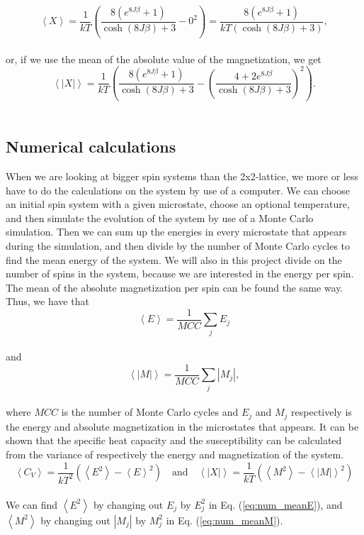 \documentclass[12pt]{article}
\begin{document}
\begin{flushleft}
\vspace{5mm}
$$\left<X\right> = \frac{1}{kT}\left(\frac{8\left(e^{8J\beta} + 1\right)}{\cosh(8J\beta) + 3} - 0^2\right) = \frac{8\left(e^{8J\beta} + 1\right)}{kT\left(\cosh(8J\beta) + 3\right)},$$\\
\vspace{5mm}
or, if we use the mean of the absolute value of the magnetization, we get
\vspace{5mm}
$$\left<|X|\right> = \frac{1}{kT}\left(\frac{8\left(e^{8J\beta} + 1\right)}{\cosh(8J\beta) + 3} - \left(\frac{4 + 2e^{8J\beta}}{\cosh(8J\beta) + 3}\right)^2\right).$$\\
\subsection{Numerical calculations}
When we are looking at bigger spin systems than the 2x2-lattice, we more or less have to do the calculations on the system by use of a computer. We can choose an initial spin system with a given microstate, choose an optional temperature, and then simulate the evolution of the system by use of a Monte Carlo simulation. Then we can sum up the energies in every microstate that appears during the simulation, and then divide by the number of Monte Carlo cycles to find the mean energy of the system. We will also in this project divide on the number of spins in the system, because we are interested in the energy per spin. The mean of the absolute magnetization per spin can be found the same way. Thus, we have that
\vspace{5mm}
\begin{equation}\label{eq:num_meanE}
\left<E\right> = \frac{1}{MCC}\sum\limits_j E_j
\end{equation}\\
and\\
\begin{equation}\label{eq:num_meanM}
\left<|M|\right> = \frac{1}{MCC}\sum\limits_j |M_j| ,
\end{equation}\\
\vspace{5mm}
where $MCC$ is the number of Monte Carlo cycles and $E_j$ and $M_j$ respectively is the energy and absolute magnetization in the microstates that appears. It can be shown that the specific heat capacity and the susceptibility can be calculated from the variance of respectively the energy and magnetization of the system.
\vspace{5mm}
$$\left<C_V\right> = \frac{1}{kT^2}\left(\left<E^2\right> - \left<E\right>^2\right)\quad\text{and}\quad \left<|X|\right> = \frac{1}{kT}\left(\left<M^2\right> - \left<|M|\right>^2\right)$$\\
\vspace{5mm}
We can find $\left<E^2\right>$ by changing out $E_j$ by $E_j^2$ in Eq. (\ref{eq:num_meanE}), and $\left<M^2\right>$ by changing out $|M_j|$ by $M_j^2$ in Eq. (\ref{eq:num_meanM}). 


\end{flushleft}
\end{document}
